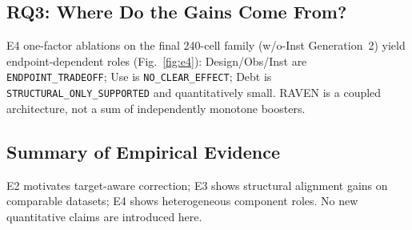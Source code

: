 \subsection{RQ3: Where Do the Gains Come From?}
E4 one-factor ablations on the final 240-cell family (w/o-Inst Generation~2) yield endpoint-dependent roles (Fig.~\ref{fig:e4}): Design/Obs/Inst are \texttt{ENDPOINT\_TRADEOFF}; Use is \texttt{NO\_CLEAR\_EFFECT}; Debt is \texttt{STRUCTURAL\_ONLY\_SUPPORTED} and quantitatively small. RAVEN is a coupled architecture, not a sum of independently monotone boosters.

\subsection{Summary of Empirical Evidence}
E2 motivates target-aware correction; E3 shows structural alignment gains on comparable datasets; E4 shows heterogeneous component roles. No new quantitative claims are introduced here.
